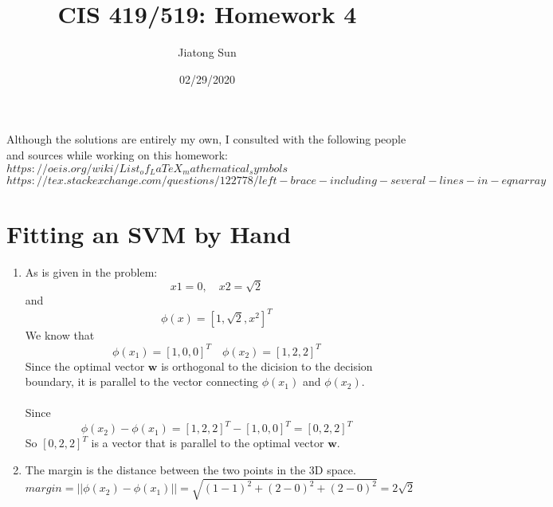 \documentclass{article}
\title{CIS 419/519: Homework 4}
\author{Jiatong Sun}
\date{02/29/2020}
\begin{document}
    \maketitle
    Although the solutions are entirely my own, I consulted with the following people and sources while working on this homework:\\
$https://oeis.org/wiki/List_of_LaTeX_mathematical_symbols$\\
$https://tex.stackexchange.com/questions/122778/left-brace-including-several-lines-in-eqnarray$
    
    \section{Fitting an SVM by Hand}
        \begin{enumerate}[label=\alph*.]
            \item %
            As is given in the problem:
            \begin{equation}
            	x1=0,\quad x2=\sqrt{2}
            \end{equation}
            and
            \begin{equation}
            	\phi(x)=[1,\sqrt{2},x^2]^T
            \end{equation}
            We know that
            \begin{equation}
            	\phi(x_1)=[1,0,0]^T
            	\quad
            	\phi(x_2)=[1,2,2]^T
            \end{equation}
            Since the optimal vector $\boldsymbol{w}$ is orthogonal to the dicision to the decision boundary, it is parallel to the vector connecting $\phi(x_1)$ and $\phi(x_2)$.\\\\
            Since
            \begin{equation}
            	\phi(x_2)-\phi(x_1)=
            	[1,2,2]^T-[1,0,0]^T=
            	[0,2,2]^T
            \end{equation}
            So $[0,2,2]^T$ is a vector that is parallel to the optimal vector $\boldsymbol{w}$.
            
            \item %
            The margin is the distance between the two points in the 3D space.
            \begin{equation}
            	margin = ||\phi(x_2)-\phi(x_1)||
            	=\sqrt{(1-1)^2+(2-0)^2+(2-0)^2}
            	=2\sqrt{2}
            \end{equation}
            

\end{enumerate}
\end{document}
